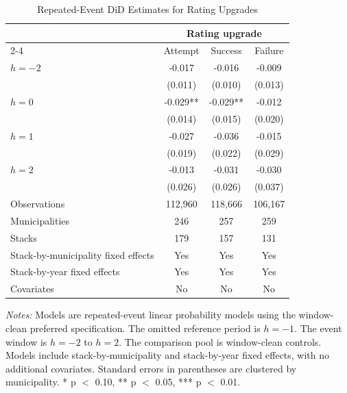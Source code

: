 \begin{table}[!htbp]
\centering
\caption{Repeated-Event DiD Estimates for Rating Upgrades}
\label{tab:northeast_did_upgrade}
\small
\begin{tabular}{lccc}
\toprule
 & \multicolumn{3}{c}{Rating upgrade} \\
\cmidrule(lr){2-4}
 & Attempt & Success & Failure \\
\midrule
$h=-2$ & -0.017 & -0.016 & -0.009 \\
 & (0.011) & (0.010) & (0.013) \\
$h=0$ & -0.029** & -0.029** & -0.012 \\
 & (0.014) & (0.015) & (0.020) \\
$h=1$ & -0.027 & -0.036 & -0.015 \\
 & (0.019) & (0.022) & (0.029) \\
$h=2$ & -0.013 & -0.031 & -0.030 \\
 & (0.026) & (0.026) & (0.037) \\
\midrule
Observations & 112,960 & 118,666 & 106,167 \\
Municipalities & 246 & 257 & 259 \\
Stacks & 179 & 157 & 131 \\
Stack-by-municipality fixed effects & Yes & Yes & Yes \\
Stack-by-year fixed effects & Yes & Yes & Yes \\
Covariates & No & No & No \\
\bottomrule
\end{tabular}
\vspace{0.05in}
\begin{minipage}{0.96\textwidth}\footnotesize\emph{Notes:} Models are repeated-event linear probability models using the window-clean preferred specification. The omitted reference period is $h=-1$. The event window is $h=-2$ to $h=2$. The comparison pool is window-clean controls. Models include stack-by-municipality and stack-by-year fixed effects, with no additional covariates. Standard errors in parentheses are clustered by municipality. * p $<$ 0.10, ** p $<$ 0.05, *** p $<$ 0.01.\end{minipage}
\end{table}
